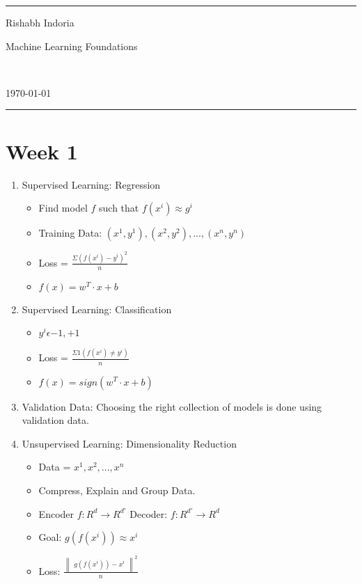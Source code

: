 \documentclass[a4paper]{article}
\begin{document}
\fancyhead[c]{}
\hrule \medskip
\begin{minipage}{0.295\textwidth}
\raggedright
Rishabh Indoria
\end{minipage}
\begin{minipage}{0.4\textwidth}
\centering
\LARGE
Machine Learning Foundations
\end{minipage}\
\begin{minipage}{0.295\textwidth}
\raggedleft
\today \hfill \\
\end{minipage}
\medskip \hrule
\bigskip

\section{Week 1}
	\begin{enumerate}
		\item Supervised Learning: Regression
		\begin{itemize}
			\item Find model $f$ such that $f(x^{i})\approx g^{i}$
			\item Training Data: ${(x^{1},y^{1}),(x^{2},y^{2}),...,(x^{n},y^{n})}$
			\item Loss = $\frac{\Sigma (f(x^{i}) - y^{i})^{2}}{n}$
			\item $f(x) = w^{T}\cdot x + b$
		\end{itemize}
		\item Supervised Learning: Classification
		\begin{itemize}
			\item $y^{i}\epsilon {-1, +1}$
			\item Loss = $\frac{\Sigma 1(f(x^{i})\neq y^{i})}{n}$
			\item $f(x) = sign(w^{T}\cdot x + b)$
		\end{itemize}
		\item Validation Data: Choosing the right collection of models is done using validation data.
		\item Unsupervised Learning: Dimensionality Reduction
		\begin{itemize}
			\item Data = ${x^{1},x^{2},...,x^{n}}$
			\item Compress, Explain and Group Data.
			\item Encoder $f:R^{d}\rightarrow R^{d'}$ Decoder: $f:R^{d'}\rightarrow R^{d}$
			\item Goal: $g(f(x^{i})) \approx x^{i}$
			\item Loss: $\frac{\begin{Vmatrix} g(f(x^{i}))-x^{i} \end{Vmatrix}^{2}}{n}$

\end{itemize}
\end{enumerate}
\end{document}
